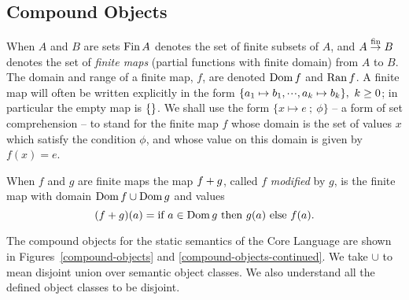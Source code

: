 
\subsection{Compound Objects}
When $A$ and $B$ are sets $\mathop{\rm Fin}\nolimits A$ denotes the set of finite subsets of $A$,
and $A\stackrel{{\rm fin}}{\to}B$ denotes the set of {\sl finite maps} (partial functions
with finite domain) from $A$ to $B$.
The domain and range of a finite map, $f$, are denoted $\mathop{\rm Dom}\nolimits f$ and
$\mathop{\rm Ran}\nolimits f$.
A finite map will often be written explicitly in the form $\{a_1\mapsto b_1,\mbox{$\cdot\!\cdot\!\cdot$},a_k\mapsto b_k\},
\ k\geq 0$;
in particular the empty map is $\{\}$.
We shall use the form $\{x\mapsto e\  ;\  \phi\}$ -- a form of set
comprehension -- to stand for the finite map $f$ whose domain
is the set of values $x$ which satisfy the condition $\phi$, and
whose value on this domain is given by $f(x)=e$.

When $f$ and $g$ are finite maps the map $f + g$, called
$f$ {\sl modified} by $g$, is the finite map with domain
$\mathop{\rm Dom}\nolimits f \cup \mathop{\rm Dom}\nolimits g$ and values
\[(f + g)(a) = \mbox{if $a\in\mathop{\rm Dom}\nolimits g$ then $g(a)$ else $f(a)$.}
\]

The compound objects for the static semantics of the Core Language are
shown in Figures~\ref{compound-objects} and \ref{compound-objects-continued}.
We take $\cup$ to mean disjoint union over
semantic object classes. We also understand all the defined object
classes to be disjoint.

